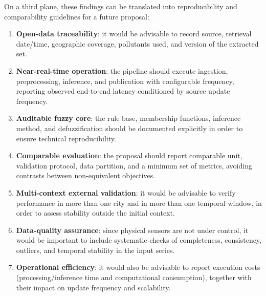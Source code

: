 On a third plane, these findings can be translated into reproducibility and comparability guidelines for a future proposal:
\begin{enumerate}
\item \textbf{Open-data traceability}: it would be advisable to record source, retrieval date/time, geographic coverage, pollutants used, and version of the extracted set.
\item \textbf{Near-real-time operation}: the pipeline should execute ingestion, preprocessing, inference, and publication with configurable frequency, reporting observed end-to-end latency conditioned by source update frequency.
\item \textbf{Auditable fuzzy core}: the rule base, membership functions, inference method, and defuzzification should be documented explicitly in order to ensure technical reproducibility.
\item \textbf{Comparable evaluation}: the proposal should report comparable unit, validation protocol, data partition, and a minimum set of metrics, avoiding contrasts between non-equivalent objectives.
\item \textbf{Multi-context external validation}: it would be advisable to verify performance in more than one city and in more than one temporal window, in order to assess stability outside the initial context.
\item \textbf{Data-quality assurance}: since physical sensors are not under control, it would be important to include systematic checks of completeness, consistency, outliers, and temporal stability in the input series.
\item \textbf{Operational efficiency}: it would also be advisable to report execution costs (processing/inference time and computational consumption), together with their impact on update frequency and scalability.
\end{enumerate}
